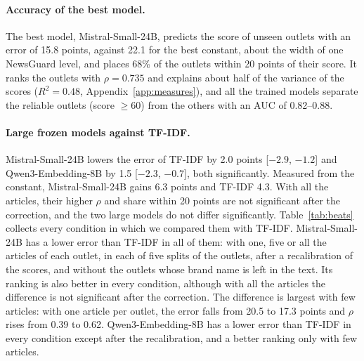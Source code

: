 \documentclass[11pt,a4paper]{article}
\begin{document}
\paragraph{Accuracy of the best model.} The best model, Mistral-Small-24B, predicts the score of unseen outlets with an
error of 15.8 points, against 22.1 for the best constant, about the width of one NewsGuard level, and places 68\% of the
outlets within 20 points of their score. It ranks the outlets with $\rho = 0.735$ and explains about half of the
variance of the scores ($R^2 = 0.48$, Appendix~\ref{app:measures}), and all the trained models separate the reliable
outlets (score $\geq 60$) from the others with an AUC of 0.82--0.88.

\paragraph{Large frozen models against TF-IDF.} Mistral-Small-24B lowers the error of TF-IDF by 2.0 points [$-2.9$,
$-1.2$] and Qwen3-Embedding-8B by 1.5 [$-2.3$, $-0.7$], both significantly. Measured from the constant, Mistral-Small-24B
gains 6.3 points and TF-IDF 4.3. With all the articles, their higher $\rho$ and share within 20 points are not
significant after the correction, and the two large models do not differ significantly. Table~\ref{tab:beats} collects
every condition in which we compared them with TF-IDF. Mistral-Small-24B has a lower error than TF-IDF in all of them:
with one, five or all the articles of each outlet, in each of five splits of the outlets, after a recalibration of the
scores, and without the outlets whose brand name is left in the text.
Its ranking is also better in every condition, although with all the articles the difference is not significant after
the correction. The difference is largest with few articles: with one article per outlet, the error falls from 20.5 to
17.3 points and $\rho$ rises from 0.39 to 0.62. Qwen3-Embedding-8B has a lower error than TF-IDF in every condition
except after the recalibration, and a better ranking only with few articles.
\end{document}
